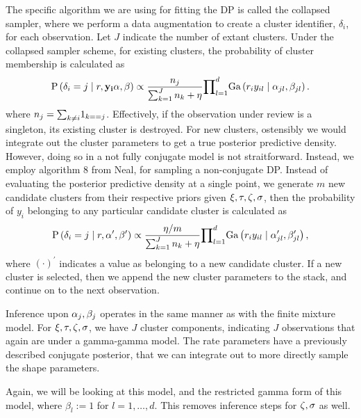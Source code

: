   The specific algorithm we are using for fitting the DP is called the collapsed sampler\findcite,
  where we perform a data augmentation to create a cluster identifier, $\delta_i$, for each observation.
  Let $J$ indicate the number of extant clusters.  Under the collapsed sampler scheme, for existing
  clusters, the probability of cluster membership is calculated as
  \begin{equation}
    \label{eqn:dpdelta}
    \text{P}\left(\delta_i = j\mid r, {\bf y_i} {\bf \alpha}, {\bf \beta}\right) \propto
        \frac{n_j}{\sum_{k = 1}^{J} n_k + \eta}
        {\small\prod}_{l = 1}^d\text{Ga}\left(r_iy_{il}\mid\alpha_{jl},\beta_{jl}\right).
  \end{equation}
  where $n_j = {\small\sum}_{k\neq i}1_{k == j}$.  Effectively, if the observation under review is a
  singleton, its existing cluster is destroyed.  For new clusters, ostensibly we would integrate out
  the cluster parameters to get a true posterior predictive density.  However, doing so in a not
  fully conjugate model is not straitforward.  Instead, we employ algorithm 8 from Neal\cite{neal2000},
  for sampling a non-conjugate DP.  Instead of evaluating the posterior predictive density at a
  single point, we generate $m$ new candidate clusters from their respective priors given
  ${\bf \xi,\tau,\zeta,\sigma}$, then the probability of $y_i$ belonging to any particular candidate
  cluster is calculated as
  \begin{equation}
    \label{eqn:dpdeltanew}
    \text{P}\left(\delta_i = j\mid r, {\bf \alpha}^{\prime}, {\bf \beta}^{\prime}\right) \propto
        \frac{\eta / m}{\sum_{k = 1}^{J} n_k + \eta}
        {\small\prod}_{l = 1}^d\text{Ga}\left(r_iy_{il}\mid\alpha_{jl}^{\prime},\beta_{jl}^{\prime}\right),
  \end{equation}
  where $(\cdot)^{\prime}$ indicates a value as belonging to a new candidate cluster.  If a new cluster
  is selected, then we append the new cluster parameters to the stack, and continue on to the next
  observation.

Inference upon ${\bf \alpha}_j,{\bf \beta}_j$ operates in the same manner as with the finite mixture
  model.  For ${\bf \xi,\tau,\zeta,\sigma}$, we have $J$ cluster components, indicating $J$
  observations that again are under a gamma-gamma model.  The rate parameters have a previously
  described conjugate posterior, that we can integrate out to more directly sample the shape
  parameters.

Again, we will be looking at this model, and the restricted gamma form of this model, where
  $\beta_l := 1$ for $l = 1,\ldots,d$.  This removes inference steps for ${\bf \zeta},{\bf \sigma}$
  as well.

